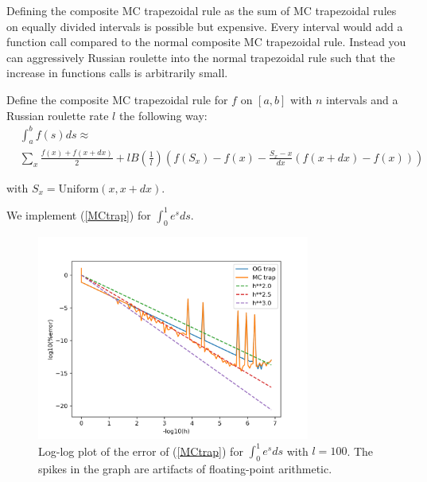 \documentclass[a4paper,12pt]{article}
\begin{document}
Defining the composite MC trapezoidal rule as
the sum of MC trapezoidal rules on equally divided intervals
is possible but expensive. Every interval would add a function call
compared to the normal composite MC trapezoidal rule. Instead
you can aggressively Russian roulette into the normal trapezoidal rule
such that the increase in functions calls is arbitrarily small.

\begin{definition} \label{MCtrap}
    Define the composite MC trapezoidal rule for $f$ on $[a,b]$ with
    $n$ intervals and a Russian roulette rate $l$ the following way:
    \begin{align}
         & \int_{a}^{b} f(s)ds \approx        \\
         & \sum_{x}  \frac{f(x)+f(x+dx)}{2} +
        l B \left(\frac{1}{l} \right)
        \left(f(S_{x})-f(x)-\frac{S_{x}-x}{dx}(f(x+dx)-f(x)) \right)
    \end{align}

    with $S_{x} = \text{Uniform}(x,x+dx)$.

\end{definition}

\begin{pythonn}
    We implement (\ref{MCtrap}) for $\int_{0}^{1}e^{s}ds$.
    \vspace*{0.5cm}

    \begin{figure}[h!]
        \centering
        \includegraphics[width=0.8\textwidth]{plots/MCtrap.png}
        \caption{Log-log plot of the error of (\ref{MCtrap}) for
        $\int_{0}^{1}e^{s}ds$ with $l=100$.
        The spikes in the graph are artifacts
        of floating-point arithmetic.
        }
        \label{fig:MCtrap}
    \end{figure}
\end{pythonn}
\end{document}
